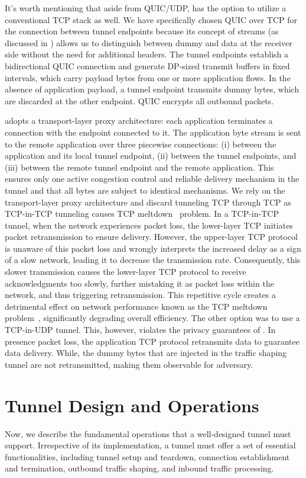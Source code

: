 It's worth mentioning that aside from QUIC/UDP, {\sys} has the option to utilize a conventional TCP stack as well.
We have specifically chosen QUIC over TCP for the connection between tunnel endpoints because its concept of streams (as discussed in ) allows us to distinguish between dummy and data at the receiver side without the need for additional headers.
The tunnel endpoints establish a bidirectional QUIC connection and generate DP-sized transmit buffers in fixed intervals, which carry payload bytes from one or more application flows.
In the absence of application payload, a tunnel endpoint transmits dummy bytes, which are discarded at the other endpoint.
QUIC encrypts all outbound packets.

{\sys} adopts a transport-layer proxy architecture: each application terminates a connection with the endpoint connected to it.
The application byte stream is sent to the remote application over three piecewise connections: 
(i) between the application and its local tunnel endpoint,
(ii) between the tunnel endpoints, and
(iii) between the remote tunnel endpoint and the remote application.
This ensures only one active congestion control and reliable delivery mechanism in the tunnel and that all bytes are subject to identical mechanisms.
We rely on the transport-layer proxy architecture and discard tunneling TCP through TCP as TCP-in-TCP tunneling causes TCP meltdown~\cite{honda2005tcpovertcp, tcp-meltdown} problem.
In a TCP-in-TCP tunnel, when the network experiences packet loss, the lower-layer TCP initiates packet retransmission to ensure delivery.
However, the upper-layer TCP protocol is unaware of this packet loss and wrongly interprets the increased delay as a sign of a slow network, leading it to decrease the transmission rate.
Consequently, this slower transmission causes the lower-layer TCP protocol to receive acknowledgments too slowly, further mistaking it as packet loss within the network, and thus triggering retransmission.
This repetitive cycle creates a detrimental effect on network performance known as the TCP meltdown problem~\cite{tcp-meltdown}, significantly degrading overall efficiency.
The other option was to use a TCP-in-UDP tunnel. 
This, however, violates the privacy guarantees of {\sys}.
In presence packet loss, the application TCP protocol retransmits data to guarantee data delivery. 
While, the dummy bytes that are injected in the traffic shaping tunnel are not retransmitted, making them observable for adversary. 


\section{Tunnel Design and Operations}\label{sec:tunnel-design}
Now, we describe the fundamental operations that a well-designed {\sys} tunnel must support.
Irrespective of its implementation, a {\sys} tunnel must offer a set of essential functionalities, including tunnel setup and teardown, connection establishment and termination, outbound traffic shaping, and inbound traffic processing. 


